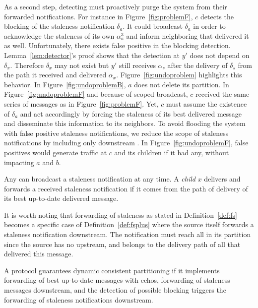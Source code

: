 As a second step, detecting \processes must proactively purge the
system from their forwarded notifications. For instance in
Figure~\ref{fig:problemF}, $c$ detects the blocking of the staleness
notification $\delta_a$. It could broadcast $\delta_a$ in order to
acknowledge the staleness of its own $\alpha_a^3$ and inform
neighboring \processes that delivered it as well. Unfortunately, there
exists false positive in the blocking detection.
Lemma~\ref{lem:detector}'s proof shows that the detection at $y'$ does
not depend on $\delta_x$. Therefore $\delta_x$ may not exist but $y'$
still receives $\alpha_s$ after the delivery of $\delta_s$ from the
path it received and delivered
$\alpha_x$. Figure~\ref{fig:undoproblem} highlights this behavior. In
Figure~\ref{fig:undoproblemB}, $a$ does not delete its partition. In
Figure~\ref{fig:undoproblemF} and because of scoped broadcast, $c$
received the same series of messages as in
Figure~\ref{fig:problemF}. Yet, $c$ must assume the existence of
$\delta_a$ and act accordingly by forcing the staleness of its best
delivered message and disseminate this information to its neighbors.
To avoid flooding the system with false positive staleness
notifications, we reduce the scope of staleness notifications by
including only downstream \processes. In
Figure~\ref{fig:undoproblemF}, false positives would generate traffic
at $c$ and its children if it had any, without impacting $a$ and $b$.

\begin{definition} Any \emph{\process} can broadcast a
  staleness notification at any time. A \emph{child \process} $x$
  delivers and forwards a received staleness notification if it comes
  from the path of delivery of its best up-to-date delivered
  message.
\end{definition}

It is worth noting that forwarding of staleness as stated in
Definition~\ref{def:fs} becomes a specific case of
Definition~\ref{def:fsplus} where the source itself forwards a
staleness notification downstream. The notification must reach all
\processes in its partition since the source has no \processes
upstream, and belongs to the delivery path of all \processes that
delivered this message.

\begin{theorem}
  A protocol guarantees dynamic consistent partitioning if it
  implements forwarding of best up-to-date messages with echos,
  forwarding of staleness messages downstream, and the detection of
  possible blocking triggers the forwarding of staleness notifications
  downstream.
\end{theorem}

